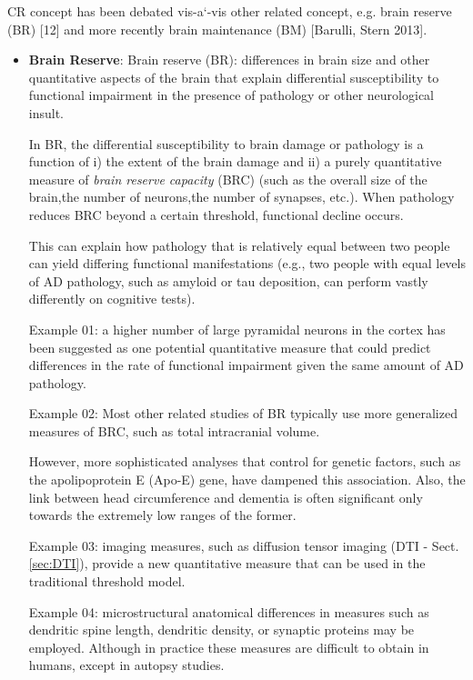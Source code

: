 \begin{mdframed}

CR concept has been debated vis-a`-vis other related concept, e.g. brain reserve
(BR) [12] and more recently brain maintenance (BM) [Barulli, Stern 2013].
\begin{itemize}
  
  \item  {\bf Brain Reserve}: Brain reserve (BR): differences in brain size and
  other quantitative aspects of the brain that explain differential
  susceptibility to functional impairment in the presence of pathology or other
  neurological insult.
  
\label{sec:BRC-brain-reserve-capacity}
In BR, the  differential susceptibility to brain damage or pathology is a
function of i) the extent of the brain damage and ii) a purely quantitative
measure of {\it brain reserve capacity} (BRC) (such as the overall size of the
brain,the number of neurons,the number of synapses, etc.). When pathology
reduces BRC beyond a certain threshold, functional decline occurs.

This can explain how pathology that is relatively equal between two people can
yield differing functional manifestations (e.g., two people with equal levels of
AD pathology, such as amyloid or tau deposition, can perform vastly differently
on cognitive tests).

Example 01: a higher number of large pyramidal neurons in the cortex has been
suggested as one potential quantitative measure that could predict differences
in the rate of functional impairment given the same amount of AD pathology.

Example 02: Most other related studies of BR typically use more generalized
measures of BRC, such as total intracranial volume.

However, more sophisticated analyses that control for genetic factors, such as
the apolipoprotein E (Apo-E) gene, have dampened this association. Also, the
link between head circumference and dementia is often significant only towards
the extremely low ranges of the former.

Example 03: imaging measures, such as diffusion tensor imaging (DTI -
Sect.\ref{sec:DTI}), provide a new quantitative measure that can be used in the
traditional threshold model.

Example 04: microstructural anatomical differences in measures such as dendritic
spine length, dendritic density, or synaptic proteins may be employed. Although
in practice these measures are difficult to obtain in humans, except in autopsy
studies.



\end{itemize}
\end{mdframed}
